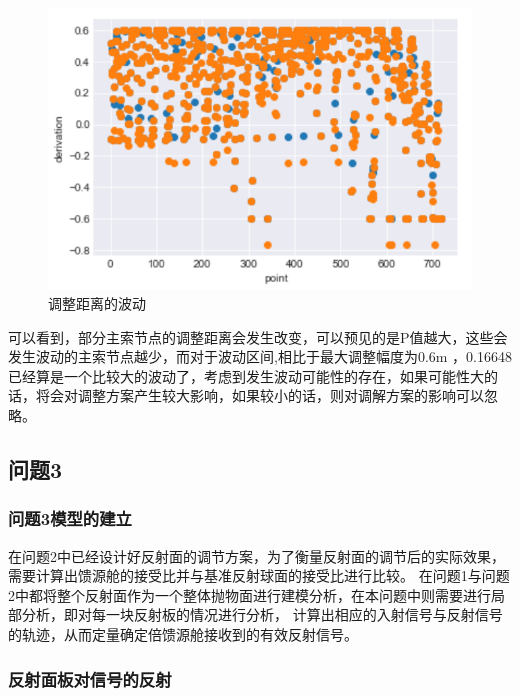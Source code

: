\documentclass[withoutpreface,bwprint]{cumcmthesis} %
\begin{document}
\begin{figure}[H]
    \centering
    \includegraphics[scale=0.3]{images/bodong.png}
    \caption{调整距离的波动}
\end{figure}

可以看到，部分主索节点的调整距离会发生改变，可以预见的是P值越大，这些会发生波动的主索节点越少，而对于波动区间,相比于最大调整幅度为0.6m ，0.16648
已经算是一个比较大的波动了，考虑到发生波动可能性的存在，如果可能性大的话，将会对调整方案产生较大影响，如果较小的话，则对调解方案的影响可以忽略。  

\hspace*{\fill}

\hspace*{\fill}
\subsection{问题3}

\subsubsection{问题3模型的建立}

在问题2中已经设计好反射面的调节方案，为了衡量反射面的调节后的实际效果，需要计算出馈源舱的接受比并与基准反射球面的接受比进行比较。
在问题1与问题2中都将整个反射面作为一个整体抛物面进行建模分析，在本问题中则需要进行局部分析，即对每一块反射板的情况进行分析，
计算出相应的入射信号与反射信号的轨迹，从而定量确定倍馈源舱接收到的有效反射信号。


\subsubsection{反射面板对信号的反射}
\end{document}
